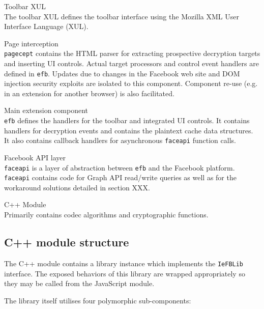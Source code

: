     \begin{sdesc}
     
    \item[Toolbar XUL] \hfill \\ The toolbar XUL defines the toolbar interface using the Mozilla XML User Interface Language (XUL).
    
    \item[Page interception] \hfill \\ {\tt pagecept} contains the HTML parser for extracting prospective decryption targets and inserting UI controls. Actual target processors and control event handlers are defined in {\tt efb}. Updates due to changes in the Facebook web site and DOM injection security exploits are isolated to this component. Component re-use (e.g. in an extension for another browser) is also facilitated. 

    \item[Main extension component] \hfill \\ {\tt efb} defines the handlers for the toolbar and integrated UI controls. It contains handlers for decryption events and contains the plaintext cache data structures. It also contains callback handlers for asynchronous {\tt faceapi} function calls.
    
    \item[Facebook API layer] \hfill \\ {\tt faceapi} is a layer of abstraction between {\tt efb} and the Facebook platform. {\tt faceapi} contains code for Graph API read/write queries as well as for the workaround solutions detailed in section XXX.

    \item[C++ Module] \hfill \\ Primarily contains codec algorithms and cryptographic functions.
    
    \end{sdesc}
    

\subsection{C++ module structure}

    The C++ module contains a library instance which implements the {\tt IeFBLib} interface. The exposed behaviors of this library are wrapped appropriately so they may be called from the JavaScript module.
    
    The library itself utilises four polymorphic sub-components:
    
